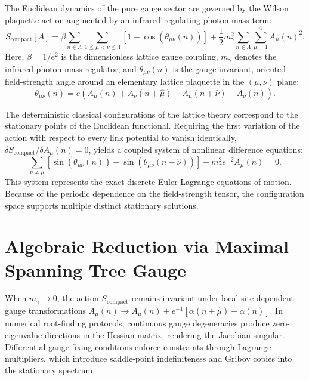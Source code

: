 \documentclass[11pt,a4paper]{article}
\begin{document}
The Euclidean dynamics of the pure gauge sector are governed by the Wilson plaquette action augmented by an infrared-regulating photon mass term:
\begin{equation}
S_{\text{compact}}[A] = \beta \sum_{n \in \Lambda} \sum_{1 \le \mu < \nu \le 4} \left[ 1 - \cos\left(\theta_{\mu\nu}(n)\right) \right] + \frac{1}{2} m_\gamma^2 \sum_{n \in \Lambda} \sum_{\mu=1}^4 A_\mu(n)^2.
\end{equation}
Here, $\beta = 1/e^2$ is the dimensionless lattice gauge coupling, $m_\gamma$ denotes the infrared photon mass regulator, and $\theta_{\mu\nu}(n)$ is the gauge-invariant, oriented field-strength angle around an elementary lattice plaquette in the $(\mu,\nu)$ plane:
\begin{equation}
\theta_{\mu\nu}(n) = e \left( A_\mu(n) + A_\nu(n+\hat{\mu}) - A_\mu(n+\hat{\nu}) - A_\nu(n) \right).
\end{equation}

The deterministic classical configurations of the lattice theory correspond to the stationary points of the Euclidean functional. Requiring the first variation of the action with respect to every link potential to vanish identically, $\delta S_{\text{compact}} / \delta A_\mu(n) = 0$, yields a coupled system of nonlinear difference equations:
\begin{equation}
\sum_{\nu \neq \mu} \left[ \sin\left(\theta_{\mu\nu}(n)\right) - \sin\left(\theta_{\mu\nu}(n-\hat{\nu})\right) \right] + m_\gamma^2 e^{-2} A_\mu(n) = 0.
\end{equation}
This system represents the exact discrete Euler-Lagrange equations of motion. Because of the periodic dependence on the field-strength tensor, the configuration space supports multiple distinct stationary solutions.

\section{Algebraic Reduction via Maximal Spanning Tree Gauge}

When $m_\gamma \to 0$, the action $S_{\text{compact}}$ remains invariant under local site-dependent gauge transformations $A_\mu(n) \to A_\mu(n) + e^{-1}[\alpha(n+\hat{\mu}) - \alpha(n)]$. In numerical root-finding protocols, continuous gauge degeneracies produce zero-eigenvalue directions in the Hessian matrix, rendering the Jacobian singular. Differential gauge-fixing conditions enforce constraints through Lagrange multipliers, which introduce saddle-point indefiniteness and Gribov copies into the stationary spectrum.
\end{document}
